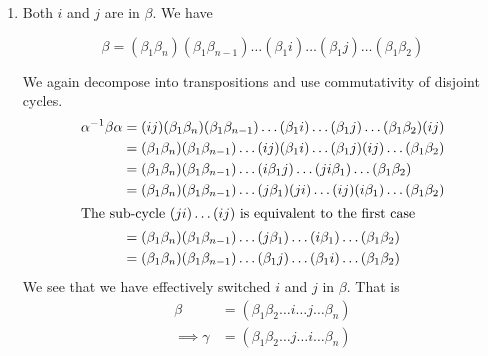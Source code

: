 \documentclass[12pt]{article}
\begin{document}
\begin{enumerate}
\item Both $i$ and $j$ are in $\beta$. We have

\[
\beta = (\beta_1 \beta_n)(\beta_1 \beta_{n - 1})\ldots(\beta_1 i)\ldots(\beta_1 j)\ldots(\beta_1 \beta_2)
\]

We again decompose into transpositions and use commutativity of disjoint cycles.
\begin{align*}
\alpha^{-1}\beta \alpha &= (ij)(\beta_1 \beta_n)(\beta_1 \beta_{n - 1})\ldots(\beta_1 i)\ldots(\beta_1 j)\ldots(\beta_1 \beta_2)(ij)\\
&= (\beta_1 \beta_n)(\beta_1 \beta_{n - 1})\ldots(ij)(\beta_1 i) \ldots(\beta_1 j)(ij)\ldots(\beta_1 \beta_2)\\
&= (\beta_1 \beta_n)(\beta_1 \beta_{n - 1})\ldots(i\beta_1 j) \ldots(j i \beta_1)\ldots(\beta_1 \beta_2)\\
&= (\beta_1 \beta_n)(\beta_1 \beta_{n - 1})\ldots(j \beta_1)(j i) \ldots(ij)(i \beta_1)\ldots(\beta_1 \beta_2)\\
\shortintertext{The sub-cycle $(j i) \ldots (ij)$ is equivalent to the first case}
&= (\beta_1 \beta_n)(\beta_1 \beta_{n - 1})\ldots(j \beta_1)\ldots(i \beta_1)\ldots(\beta_1 \beta_2)\\
&= (\beta_1 \beta_n)(\beta_1 \beta_{n - 1})\ldots(\beta_1 j)\ldots(\beta_1 i)\ldots(\beta_1 \beta_2)\\
\end{align*}
We see that we have effectively switched $i$ and $j$ in $\beta$. That is
\begin{align*}
\beta &= (\beta_1 \beta_2 \ldots i\ldots j\ldots \beta_n)\\
\implies \gamma &= (\beta_1 \beta_2 \ldots j\ldots i\ldots \beta_n)
\end{align*}

\end{enumerate}
\end{document}
